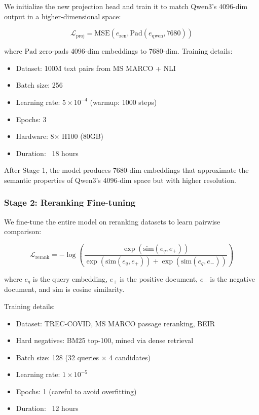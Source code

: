 \documentclass[11pt,letterpaper]{article}
\begin{document}
We initialize the new projection head and train it to match Qwen3's 4096-dim output in a higher-dimensional space:

\begin{equation}
\mathcal{L}_{\text{proj}} = \text{MSE}(e_{\text{zen}}, \text{Pad}(e_{\text{qwen}}, 7680))
\end{equation}

where $\text{Pad}$ zero-pads 4096-dim embeddings to 7680-dim. Training details:
\begin{itemize}
    \item Dataset: 100M text pairs from MS MARCO + NLI
    \item Batch size: 256
    \item Learning rate: $5 \times 10^{-4}$ (warmup: 1000 steps)
    \item Epochs: 3
    \item Hardware: 8× H100 (80GB)
    \item Duration: ~18 hours
\end{itemize}

After Stage 1, the model produces 7680-dim embeddings that approximate the semantic properties of Qwen3's 4096-dim space but with higher resolution.

\subsubsection{Stage 2: Reranking Fine-tuning}

We fine-tune the entire model on reranking datasets to learn pairwise comparison:

\begin{equation}
\mathcal{L}_{\text{rerank}} = -\log\left(\frac{\exp(\text{sim}(e_q, e_+))}{\exp(\text{sim}(e_q, e_+)) + \exp(\text{sim}(e_q, e_-))}\right)
\end{equation}

where $e_q$ is the query embedding, $e_+$ is the positive document, $e_-$ is the negative document, and $\text{sim}$ is cosine similarity.

Training details:
\begin{itemize}
    \item Dataset: TREC-COVID, MS MARCO passage reranking, BEIR
    \item Hard negatives: BM25 top-100, mined via dense retrieval
    \item Batch size: 128 (32 queries × 4 candidates)
    \item Learning rate: $1 \times 10^{-5}$
    \item Epochs: 1 (careful to avoid overfitting)
    \item Duration: ~12 hours
\end{itemize}
\end{document}

